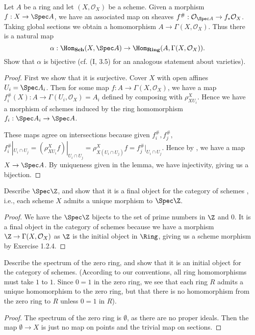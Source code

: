\begin{exercise}%
	Let $A $ be a ring and let $(X,\mathcal{O}_X) $ be a scheme. Given a morphism $f: X\to \Spec A $, we have an associated map on sheaves $f^\#: \mathcal{O}_{\Spec A} \to f_\ast \mathcal{O}_X $. Taking global sections we obtain a homomorphism $A\to \Gamma(X,\mathcal{O}_X) $. Thus there is a natural map
	\[
		\alpha: \Hom_{\text{\textbf{Sch}}}(X,\Spec A) \to \Hom_{\text{\textbf{Ring}}}(A,\Gamma(X,\mathcal{O}_X))
	.\] 
	Show that $\alpha $ is bijective (cf. (I, 3.5) for an analogous statement about varieties).
\end{exercise}
\begin{proof}
	First we show that it is surjective.
	Cover $X $ with open affines $U_i = \Spec A_i $.
	Then for some map $f: A\to \Gamma(X,\mathcal{O}_X) $, we have a map $f^\#_i(X):A\to \Gamma(U_i, \mathcal{O}_X) = A_i $ defined by composing with $\rho^X_{XU_i} $.
	Hence we have a morphism of schemes induced by the ring homomorphism $f_i: \Spec A_i \to \Spec A $.

	These maps agree on intersections because given $f_i^\#,f_j^\# $, $f_i^\#|_{U_i \cap U_j} = (\rho^X_{X U_i}f)|_{U_i\cap U_j} = \rho^X_{X (U_i\cap U_j)}f = f_j^\#|_{U_i\cap U_j}$.
	Hence by , we have a map $X\to \Spec A $.
	By uniqueness given in the lemma, we have injectivity, giving us a bijection.
\end{proof}

\begin{exercise}%
	Describe $\Spec \Z $, and show that it is a final object for the category of schemes , i.e., each scheme $X $ admits a unique morphism to $\Spec \Z $.
\end{exercise}
\begin{proof}
	We have the $\Spec \Z $ bijects to the set of prime numbers in $\Z $ and $0 $.
	It is a final object in the category of schemes because we have a morphism $\Z \to \Gamma(X, \mathcal{O}_X) $ as $\Z $ is the initial object in $\Ring $, giving us a scheme morphism by Exercise 1.2.4.
\end{proof}

\begin{exercise}
	Describe the spectrum of the zero ring, and show that it is an initial object for the category of schemes. (According to our conventions, all ring homomorphisms must take $1 $ to $1 $. Since $0 = 1 $ in the zero ring, we see that each ring $R $ admits a unique homomorphism to the zero ring, but that there is no homomorphism from the zero ring to $R $ unless $0=1 $ in $R $).
\end{exercise}
\begin{proof}
	The spectrum of the zero ring is $\emptyset $, as there are no proper ideals.
	Then the map $\emptyset \to X $ is just no map on points and the trivial map on sections.
\end{proof}

